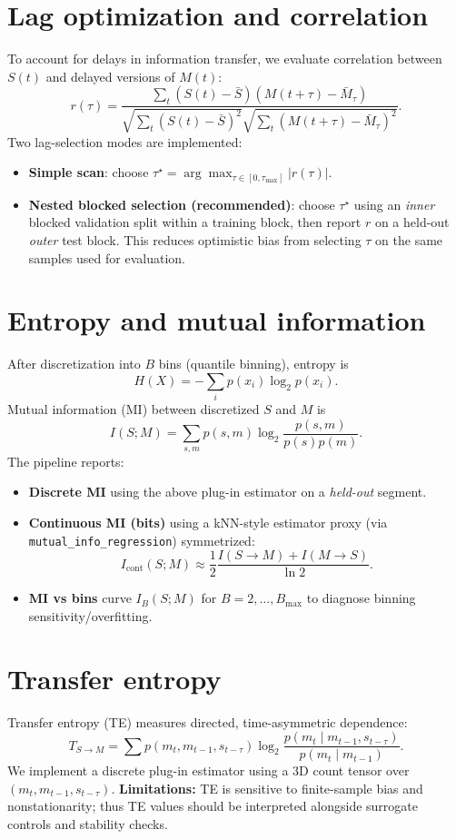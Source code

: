 \documentclass[11pt]{article}
\begin{document}
\section{Lag optimization and correlation}
To account for delays in information transfer, we evaluate correlation between $S(t)$ and delayed versions of $M(t)$:
\[
r(\tau)=\frac{\sum_{t}(S(t)-\bar{S})(M(t+\tau)-\bar{M}_{\tau})}{\sqrt{\sum_t(S(t)-\bar{S})^2}\sqrt{\sum_t(M(t+\tau)-\bar{M}_{\tau})^2}}.
\]
Two lag-selection modes are implemented:
\begin{itemize}
  \item \textbf{Simple scan}: choose $\tau^\star=\arg\max_{\tau\in[0,\tau_{\max}]} |r(\tau)|$.
  \item \textbf{Nested blocked selection (recommended)}: choose $\tau^\star$ using an \emph{inner} blocked validation split within a training block, then report $r$ on a held-out \emph{outer} test block. This reduces optimistic bias from selecting $\tau$ on the same samples used for evaluation.
\end{itemize}

\section{Entropy and mutual information}
After discretization into $B$ bins (quantile binning), entropy is
\[
H(X)=-\sum_i p(x_i)\log_2 p(x_i).
\]
Mutual information (MI) between discretized $S$ and $M$ is
\[
I(S;M)=\sum_{s,m} p(s,m)\log_2\frac{p(s,m)}{p(s)p(m)}.
\]
The pipeline reports:
\begin{itemize}
  \item \textbf{Discrete MI} using the above plug-in estimator on a \emph{held-out} segment.
  \item \textbf{Continuous MI (bits)} using a kNN-style estimator proxy (via \texttt{mutual\_info\_regression}) symmetrized:
  \[
  I_{\text{cont}}(S;M)\approx \frac{1}{2}\frac{I(S\rightarrow M)+I(M\rightarrow S)}{\ln 2}.
  \]
  \item \textbf{MI vs bins} curve $I_B(S;M)$ for $B=2,\dots,B_{\max}$ to diagnose binning sensitivity/overfitting.
\end{itemize}

\section{Transfer entropy}
Transfer entropy (TE) measures directed, time-asymmetric dependence:
\[
T_{S\to M}=\sum p(m_t,m_{t-1},s_{t-\tau})\log_2\frac{p(m_t\mid m_{t-1},s_{t-\tau})}{p(m_t\mid m_{t-1})}.
\]
We implement a discrete plug-in estimator using a 3D count tensor over $(m_t,m_{t-1},s_{t-\tau})$. \textbf{Limitations:} TE is sensitive to finite-sample bias and nonstationarity; thus TE values should be interpreted alongside surrogate controls and stability checks.
\end{document}
